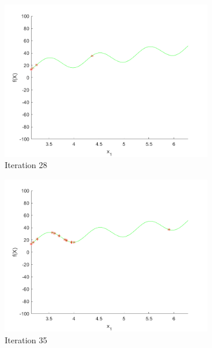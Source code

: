 \begin{figure}
\begin{subfigure}[b]{0.4\textwidth}
   \includegraphics[width=\textwidth]{img/smpl/rast1dshft/loa-iter-28}
   \caption{Iteration 28}
   \label{fig:s3-iter-4}
 \end{subfigure}
 \begin{subfigure}[b]{0.4\textwidth}
   \includegraphics[width=\textwidth]{img/smpl/rast1dshft/loa-iter-35}
   \caption{Iteration 35}
   \label{fig:s3-iter-5}
 \end{subfigure}
 \begin{subfigure}[b]{0.4\textwidth}

\end{subfigure}
\end{figure}
